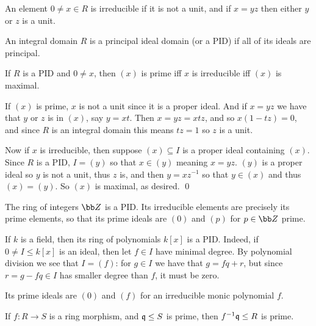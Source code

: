 \eproof

\bdefn

    \benum
        \item An element $0\neq x\in R$ is {\emphcolor irreducible} if it is not a unit, and if $x=yz$ then either $y$ or $z$ is a unit.
        \item An integral domain $R$ is a {\emphcolor principal ideal domain} (or a {\emphcolor PID}) if all of its ideals are principal.
    \eenum

\edefn

\bprop

    If $R$ is a PID and $0\neq x$, then $(x)$ is prime iff $x$ is irreducible iff $(x)$ is maximal.

\eprop

\bproof

    If $(x)$ is prime, $x$ is not a unit since it is a proper ideal.
    And if $x=yz$ we have that $y$ or $z$ is in $(x)$, say $y=xt$.
    Then $x=yz=xtz$, and so $x(1-tz)=0$, and since $R$ is an integral domain this means $tz=1$ so $z$ is a unit.

    Now if $x$ is irreducible, then suppose $(x)\subseteq I$ is a proper ideal containing $(x)$.
    Since $R$ is a PID, $I=(y)$ so that $x\in(y)$ meaning $x=yz$.
    $(y)$ is a proper ideal so $y$ is not a unit, thus $z$ is, and then $y=xz^{-1}$ so that $y\in(x)$ and thus $(x)=(y)$.
    So $(x)$ is maximal, as desired.
    \qed

\eproof

\bexam

    The ring of integers $\bZ$ is a PID.
    Its irreducible elements are precisely its prime elements, so that its prime ideals are $(0)$ and $(p)$ for $p\in\bZ$ prime.

\eexam

\bexam

    If $k$ is a field, then its ring of polynomials $k[x]$ is a PID.
    Indeed, if $0\neq I\leq k[x]$ is an ideal, then let $f\in I$ have minimal degree.
    By polynomial division we see that $I=(f)$: for $g\in I$ we have that $g=fq+r$, but since $r=g-fq\in I$ has smaller degree than $f$,
    it must be zero.

    Its prime ideals are $(0)$ and $(f)$ for an irreducible monic polynomial $f$.

\eexam

\blemm

    If $f\colon R\to S$ is a ring morphism, and ${{\frak q}}\leq S$ is prime, then $f^{-1}{{\frak q}}\leq R$ is prime.

